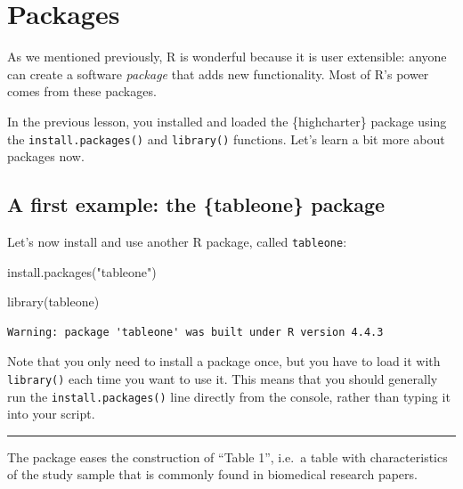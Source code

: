 \documentclass[
  letterpaper,
  DIV=11,
  numbers=noendperiod]{scrreprt}
\newenvironment{Shaded}{\begin{snugshade}}{\end{snugshade}}
\newcommand{\FunctionTok}[1]{\textcolor[rgb]{0.28,0.35,0.67}{#1}}
\newcommand{\NormalTok}[1]{\textcolor[rgb]{0.00,0.23,0.31}{#1}}
\newcommand{\StringTok}[1]{\textcolor[rgb]{0.13,0.47,0.30}{#1}}
\begin{document}
\section{Packages}\label{packages-1}

As we mentioned previously, R is wonderful because it is user
extensible: anyone can create a software \emph{package} that adds new
functionality. Most of R's power comes from these packages.

In the previous lesson, you installed and loaded the \{highcharter\}
package using the \texttt{install.packages()} and \texttt{library()}
functions. Let's learn a bit more about packages now.

\subsection{A first example: the \{tableone\}
package}\label{a-first-example-the-tableone-package}

Let's now install and use another R package, called \texttt{tableone}:

\begin{Shaded}
\begin{Highlighting}[]
\FunctionTok{install.packages}\NormalTok{(}\StringTok{"tableone"}\NormalTok{)}
\end{Highlighting}
\end{Shaded}

\begin{Shaded}
\begin{Highlighting}[]
\FunctionTok{library}\NormalTok{(tableone)}
\end{Highlighting}
\end{Shaded}

\begin{verbatim}
Warning: package 'tableone' was built under R version 4.4.3
\end{verbatim}

Note that you only need to install a package once, but you have to load
it with \texttt{library()} each time you want to use it. This means that
you should generally run the \texttt{install.packages()} line directly
from the console, rather than typing it into your script.

\begin{center}\rule{0.5\linewidth}{0.5pt}\end{center}

The package eases the construction of ``Table 1'', i.e.~a table with
characteristics of the study sample that is commonly found in biomedical
research papers.
\end{document}

